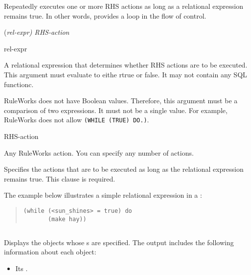 {{Repeatedly executes one or more RHS actions as long as a relational
expression remains true. In other words, provides a loop in the flow
of control.

\Format

 \co(\it{rel-expr}\co)  \it{RHS-action}

\begin{arguments}
\item[rel-expr]

  A relational expression that determines whether RHS actions are to
  be executed. This argument must evaluate to eithe rtrue or false. It
  may not contain any SQL functionc.

\begin{note}
  RuleWorks does not have Boolean values. Therefore, this argument
  must be a comparison of two expressions. It must not be a single
  value. For example, RuleWorks does not allow
  \verb|(WHILE (TRUE) DO.)|.
\end{note}

\item[RHS-action]

  Any RuleWorks action. You can specify any number of actions.
\end{arguments}

\Clause


Specifies the actions that are to be executed as long as the
relational expression remains true. This clause is required.

\Example

The example below illustrates a simple relational expression in a
:

\begin{quote}
\begin{verbatim}
(while (<sun_shines> = true) do
       (make hay))
\end{verbatim}
\end{quote}
     
\subsection{}

Displays the objects whose s are specified. The output
includes the following information about each object:

\begin{itemize}
\item Its .


\end{itemize}}}
